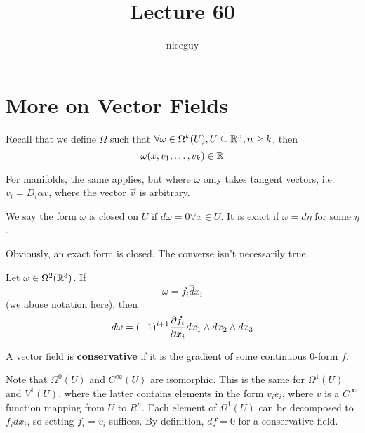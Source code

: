 \documentclass[12pt]{article}
\title{Lecture 60}
\author{niceguy}
\begin{document}
\maketitle

\section{More on Vector Fields}

Recall that we define $\Omega$ such that $\forall \omega \in \Omega^k(U), U \subseteq \mathbb{R}^n, n \ge k$, then
$$\omega(x,v_1,\dots,v_k) \in \mathbb{R}$$

For manifolds, the same applies, but where $\omega$ only takes tangent vectors, i.e. $v_i = D_i\alpha v$, where the vector $\vec v$ is arbitrary.

\begin{defn}
    We say the form $\omega$ is closed on $U$ if $d\omega = 0 \forall x \in U$. It is exact if $\omega = d\eta$ for some $\eta$.
\end{defn}

Obviously, an exact form is closed. The converse isn't necessarily true.

\begin{ex}
    Let $\omega \in \Omega^2(\mathbb{R}^3)$. If
    $$\omega = f_i \hat dx_i$$
    (we abuse notation here), then
    $$d\omega = (-1)^{i+1}\frac{\partial f_i}{\partial x_i} dx_1 \wedge dx_2 \wedge dx_3$$
\end{ex}

\begin{defn}
    A vector field is \textbf{conservative} if it is the gradient of some continuous 0-form $f$.
\end{defn}

Note that $\Omega^0(U)$ and $C^\infty(U)$ are isomorphic. This is the same for $\Omega^1(U)$ and $V^1(U)$, where the latter contains elements in the form $v_ie_i$, where $v$ is a $C^\infty$ function mapping from $U$ to $R^n$. Each element of $\Omega^1(U)$ can be decomposed to $f_idx_i$, so setting $f_i = v_i$ suffices. By definition, $df = 0$ for a conservative field.
\end{document}
